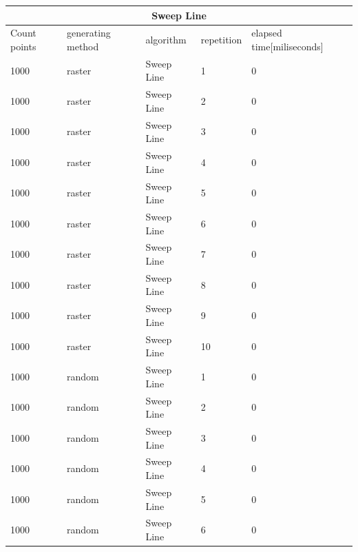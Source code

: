 \documentclass[12pt]{article}
\begin{document}
\begin{longtable}{|l|l|l|l|l|}
\hline
\multicolumn{5}{|c|}{\textbf{Sweep Line}}                                                  \\ \hline
Count points & generating method & algorithm  & repetition & elapsed time{[}miliseconds{]} \\ \hline
1000         & raster            & Sweep Line & 1          & 0                             \\ \hline
1000         & raster            & Sweep Line & 2          & 0                             \\ \hline
1000         & raster            & Sweep Line & 3          & 0                             \\ \hline
1000         & raster            & Sweep Line & 4          & 0                             \\ \hline
1000         & raster            & Sweep Line & 5          & 0                             \\ \hline
1000         & raster            & Sweep Line & 6          & 0                             \\ \hline
1000         & raster            & Sweep Line & 7          & 0                             \\ \hline
1000         & raster            & Sweep Line & 8          & 0                             \\ \hline
1000         & raster            & Sweep Line & 9          & 0                             \\ \hline
1000         & raster            & Sweep Line & 10         & 0                             \\ \hline
1000         & random            & Sweep Line & 1          & 0                             \\ \hline
1000         & random            & Sweep Line & 2          & 0                             \\ \hline
1000         & random            & Sweep Line & 3          & 0                             \\ \hline
1000         & random            & Sweep Line & 4          & 0                             \\ \hline
1000         & random            & Sweep Line & 5          & 0                             \\ \hline
1000         & random            & Sweep Line & 6          & 0                             \\ \hline

\end{longtable}
\end{document}

